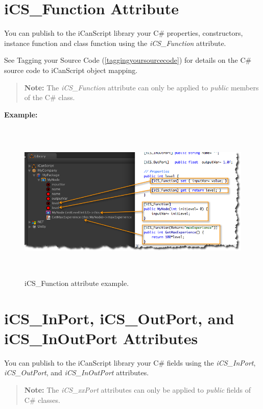 \section{iCS\_Function Attribute}
\label{ics_functionattribute}

You can publish to the iCanScript library your C\# properties, constructors, instance function and class function using the \emph{iCS\_Function} attribute.

See Tagging your Source Code (\autoref{taggingyoursourcecode}) for details on the C\# source code to iCanScript object mapping.

\begin{quote}

\textbf{Note:} The \emph{iCS\_Function} attribute can only be applied to \emph{public} members of the C\# class.
\end{quote}

\textbf{Example:}

\begin{figure}[htbp]
\centering
\includegraphics[width=479pt,height=219pt]{attribute-ics_function-example.png}
\caption{iCS\_Function attribute example.}
\label{attribute-ics_function-example.png}
\end{figure}

\section{iCS\_InPort, iCS\_OutPort, and iCS\_InOutPort Attributes}
\label{ics_inportics_outportandics_inoutportattributes}

You can publish to the iCanScript library your C\# fields using the \emph{iCS\_InPort}, \emph{iCS\_OutPort}, and \emph{iCS\_InOutPort} attributes.

\begin{quote}

\textbf{Note:} The \emph{iCS\_xxPort} attributes can only be applied to \emph{public} fields of C\# classes.
\end{quote}

